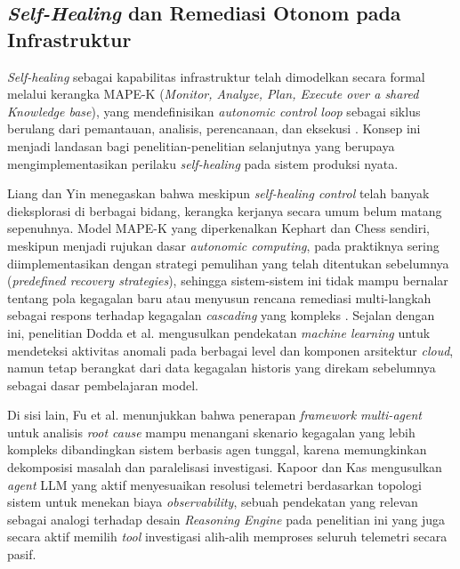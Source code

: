 \subsection{\textit{Self-Healing} dan Remediasi Otonom pada Infrastruktur}

\textit{Self-healing} sebagai kapabilitas infrastruktur telah dimodelkan secara formal melalui kerangka MAPE-K (\textit{Monitor, Analyze, Plan, Execute over a shared Knowledge base}), yang mendefinisikan \textit{autonomic control loop} sebagai siklus berulang dari pemantauan, analisis, perencanaan, dan eksekusi \cite{kephart2003vision}. Konsep ini menjadi landasan bagi penelitian-penelitian selanjutnya yang berupaya mengimplementasikan perilaku \textit{self-healing} pada sistem produksi nyata.

Liang dan Yin \cite{liang2023self} menegaskan bahwa meskipun \textit{self-healing control} telah banyak dieksplorasi di berbagai bidang, kerangka kerjanya secara umum belum matang sepenuhnya. Model MAPE-K yang diperkenalkan Kephart dan Chess \cite{kephart2003vision} sendiri, meskipun menjadi rujukan dasar \textit{autonomic computing}, pada praktiknya sering diimplementasikan dengan strategi pemulihan yang telah ditentukan sebelumnya (\textit{predefined recovery strategies}), sehingga sistem-sistem ini tidak mampu bernalar tentang pola kegagalan baru atau menyusun rencana remediasi multi-langkah sebagai respons terhadap kegagalan \textit{cascading} yang kompleks \cite{liang2023self, kephart2003vision}. Sejalan dengan ini, penelitian Dodda et al. \cite{dodda2024enhancing} mengusulkan pendekatan \textit{machine learning} untuk mendeteksi aktivitas anomali pada berbagai level dan komponen arsitektur \textit{cloud}, namun tetap berangkat dari data kegagalan historis yang direkam sebelumnya sebagai dasar pembelajaran model.

Di sisi lain, Fu et al. \cite{fu2025leveraging} menunjukkan bahwa penerapan \textit{framework} \textit{multi-agent} untuk analisis \textit{root cause} mampu menangani skenario kegagalan yang lebih kompleks dibandingkan sistem berbasis agen tunggal, karena memungkinkan dekomposisi masalah dan paralelisasi investigasi. Kapoor dan Kas \cite{kapoor2026breaking} mengusulkan \textit{agent} LLM yang aktif menyesuaikan resolusi telemetri berdasarkan topologi sistem untuk menekan biaya \textit{observability}, sebuah pendekatan yang relevan sebagai analogi terhadap desain \textit{Reasoning Engine} pada penelitian ini yang juga secara aktif memilih \textit{tool} investigasi alih-alih memproses seluruh telemetri secara pasif.

